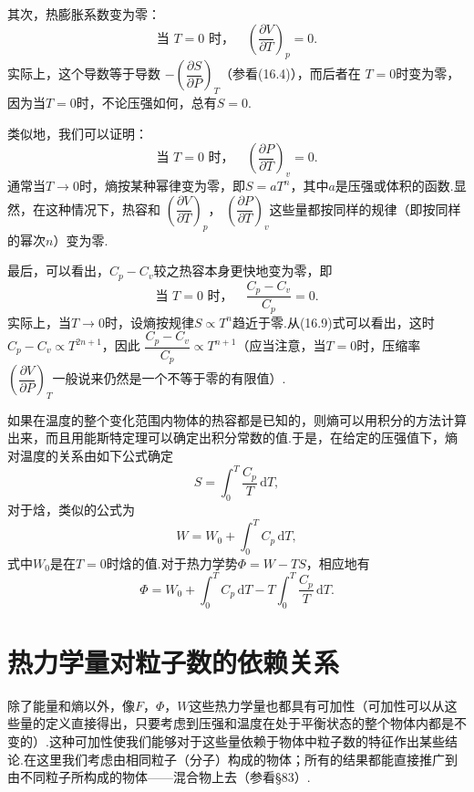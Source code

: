 其次，热膨胀系数变为零：
\begin{equation}
  \text{当~$T=0$~时，}\quad
  \left(\frac{\partial V}{\partial T}\right)_p=0.
\end{equation}
实际上，这个导数等于导数
$-\left(\dfrac{\partial S}{\partial P}\right)_T$（参看(16.4)），而后者在
$T=0$时变为零，因为当$T=0$时，不论压强如何，总有$S=0$.

类似地，我们可以证明：
\begin{equation}
  \text{当~$T=0$~时，}\quad
  \left(\frac{\partial P}{\partial T}\right)_v=0.
\end{equation}
通常当$T\to0$时，熵按某种幂律变为零，即$S=aT^n$，其中$a$是压强或体积的函数.显然，在这种情况下，热容和
$\left(\dfrac{\partial V}{\partial T}\right)_p$，
$\left(\dfrac{\partial P}{\partial T}\right)_v$这些量都按同样的规律（即按同样的幂次$n$）变为零.

最后，可以看出，$C_p-C_v$较之热容本身更快地变为零，即
\begin{equation}
  \text{当~$T=0$~时，}\quad
  \frac{C_p-C_v}{C_p}=0.
\end{equation}
实际上，当$T\to0$时，设熵按规律$S\propto T^n$趋近于零.从(16.9)式可以看出，这时$C_p-C_v\propto T^{2n+1}$，因此
$\dfrac{C_p-C_v}{C_p}\propto T^{n+1}$（应当注意，当$T=0$时，压缩率
$\left(\dfrac{\partial V}{\partial P}\right)_T$一般说来仍然是一个不等于零的有限值）.

如果在温度的整个变化范围内物体的热容都是已知的，则熵可以用积分的方法计算出来，而且用能斯特定理可以确定出积分常数的值.于是，在给定的压强值下，熵对温度的关系由如下公式确定
\begin{equation}
  S=\int_0^T\frac{C_p}{T}\,\mathrm{d}T,
\end{equation}
对于焓，类似的公式为
\begin{equation}
  W=W_0+\int_0^T C_p\,\mathrm{d}T,
\end{equation}
式中$W_0$是在$T=0$时焓的值.对于热力学势$\varPhi=W-TS$，相应地有
\begin{equation}
  \varPhi=W_0+\int_0^T C_p\,\mathrm{d}T
  -T\int_0^T\frac{C_p}{T}\,\mathrm{d}T.
\end{equation}

\section{热力学量对粒子数的依赖关系}

除了能量和熵以外，像$F$，$\varPhi$，$W$这些热力学量也都具有可加性（可加性可以从这些量的定义直接得出，只要考虑到压强和温度在处于平衡状态的整个物体内都是不变的）.这种可加性使我们能够对于这些量依赖于物体中粒子数的特征作出某些结论.在这里我们考虑由相同粒子（分子）构成的物体；所有的结果都能直接推广到由不同粒子所构成的物体——混合物上去（参看§83）.

